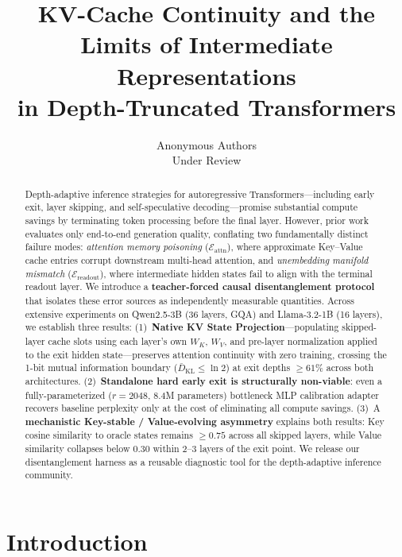 \documentclass{article}
\title{KV-Cache Continuity and the Limits of Intermediate Representations\\in Depth-Truncated Transformers}
\author{
  Anonymous Authors \\
  Under Review
}
\newcommand{\kl}{\bar{D}_{\mathrm{KL}}}
\newcommand{\Eattn}{\mathcal{E}_{\text{attn}}}
\newcommand{\Ereadout}{\mathcal{E}_{\text{readout}}}
\begin{document}
\maketitle

\begin{abstract}
Depth-adaptive inference strategies for autoregressive Transformers---including early exit, layer skipping, and self-speculative decoding---promise substantial compute savings by terminating token processing before the final layer. However, prior work evaluates only end-to-end generation quality, conflating two fundamentally distinct failure modes: \emph{attention memory poisoning} ($\Eattn$), where approximate Key--Value cache entries corrupt downstream multi-head attention, and \emph{unembedding manifold mismatch} ($\Ereadout$), where intermediate hidden states fail to align with the terminal readout layer. We introduce a \textbf{teacher-forced causal disentanglement protocol} that isolates these error sources as independently measurable quantities. Across extensive experiments on Qwen2.5-3B (36 layers, GQA) and Llama-3.2-1B (16 layers), we establish three results:
(1)~\textbf{Native KV State Projection}---populating skipped-layer cache slots using each layer's own $W_K$, $W_V$, and pre-layer normalization applied to the exit hidden state---preserves attention continuity with zero training, crossing the 1-bit mutual information boundary ($\kl \le \ln 2$) at exit depths $\ge 61\%$ across both architectures.
(2)~\textbf{Standalone hard early exit is structurally non-viable}: even a fully-parameterized ($r{=}2048$, 8.4M parameters) bottleneck MLP calibration adapter recovers baseline perplexity only at the cost of eliminating all compute savings.
(3)~A \textbf{mechanistic Key-stable / Value-evolving asymmetry} explains both results: Key cosine similarity to oracle states remains $\ge 0.75$ across all skipped layers, while Value similarity collapses below 0.30 within 2--3 layers of the exit point. We release our disentanglement harness as a reusable diagnostic tool for the depth-adaptive inference community.
\end{abstract}

\section{Introduction}
\label{sec:intro}
\end{document}
